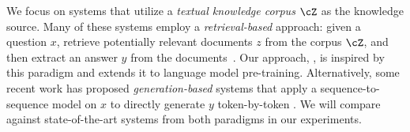 We focus on \openqa systems that utilize a \emph{textual knowledge corpus} $\cZ$ as the knowledge source.
Many of these systems employ a \emph{retrieval-based} approach:
given a question $x$, retrieve potentially relevant documents $z$ from the corpus $\cZ$,
and then extract an answer $y$ from the documents~\cite{askmsr,drqa,orqa}.
Our approach, \thename, is inspired by this paradigm and extends it to language model pre-training.
Alternatively, some recent work has proposed \emph{generation-based} systems that
apply a sequence-to-sequence model on $x$ to directly generate $y$ token-by-token
\cite{bart_not_bert,t5}.
We will compare against state-of-the-art systems from both paradigms in our experiments.